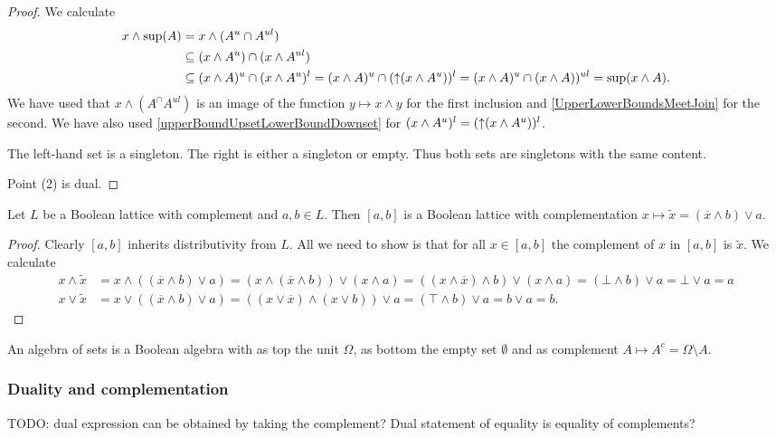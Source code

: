 \begin{proof}
We calculate
\begin{align*}
x\wedge \sup(A) &= x\wedge (A^u\cap A^{ul}) \\
&\subseteq (x\wedge A^u)\cap (x\wedge A^{ul}) \\
&\subseteq (x\wedge A)^u\cap (x\wedge A^{u})^l = (x\wedge A)^u\cap (\operatorname{\uparrow}(x\wedge A^{u}))^l = (x\wedge A)^u\cap (x\wedge A))^{ul} = \sup(x\wedge A).
\end{align*}
We have used that $x\wedge (A^\cap A^{ul})$ is an image of the function $y\mapsto x\wedge y$ for the first inclusion and \ref{UpperLowerBoundsMeetJoin} for the second. We have also used \ref{upperBoundUpsetLowerBoundDownset} for $(x\wedge A^{u})^l = (\operatorname{\uparrow}(x\wedge A^{u}))^l$.

The left-hand set is a singleton. The right is either a singleton or empty. Thus both sets are singletons with the same content.

Point (2) is dual.
\end{proof}

\begin{proposition}
Let $L$ be a Boolean lattice with complement and $a,b\in L$. Then $[a,b]$ is a Boolean lattice with complementation $x\mapsto \widetilde{x} = (\overline{x} \wedge b)\vee a$. 
\end{proposition}
\begin{proof}
Clearly $[a,b]$ inherits distributivity from $L$. All we need to show is that for all $x\in [a,b]$ the complement of $x$ in $[a,b]$ is $\widetilde{x}$. We calculate
\begin{align*}
x \wedge \widetilde{x} &= x\wedge ((\overline{x} \wedge b)\vee a) = (x\wedge(\overline{x} \wedge b))\vee (x\wedge a) = (( x\wedge \overline{x}) \wedge b)\vee (x\wedge a) = (\bot \wedge b)\vee a = \bot \vee a = a \\
x \vee \widetilde{x} &= x\vee ((\overline{x} \wedge b)\vee a) = ((x\vee \overline{x}) \wedge (x\vee b))\vee a = (\top \wedge b) \vee a = b\vee a = b.
\end{align*}
\end{proof}

\begin{proposition}
An algebra of sets is a Boolean algebra with as top the unit $\Omega$, as bottom the empty set $\emptyset$ and as complement $A\mapsto A^c = \Omega\setminus A$.
\end{proposition}

\subsubsection{Duality and complementation}
TODO: dual expression can be obtained by taking the complement? Dual statement of equality is equality of complements?

